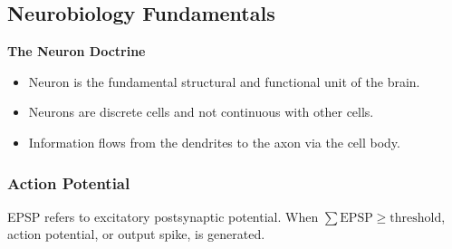 \documentclass[11pt]{article}
\begin{document}
\subsection{Neurobiology Fundamentals}
\noindent \textbf{The Neuron Doctrine}
\begin{itemize}
    \item Neuron is the fundamental structural and functional unit of the brain.
    \item Neurons are discrete cells and not continuous with other cells.
    \item Information flows from the dendrites to the axon via the cell body.
\end{itemize}
\subsubsection{Action Potential}
EPSP refers to excitatory postsynaptic potential. When $\sum \text{EPSP}\geq \text{threshold}$, action potential, or output spike, is generated.
\end{document}
